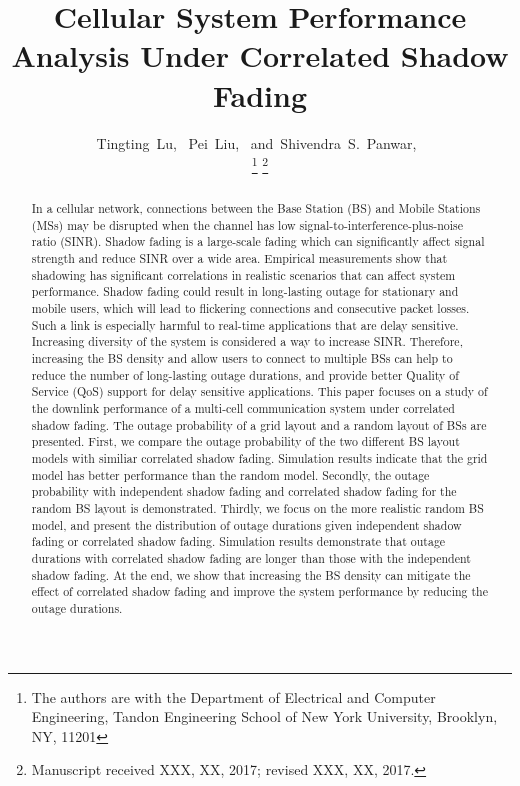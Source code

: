 \documentclass[journal,10pt]{IEEEtran}
\begin{document}

\title{Cellular System Performance Analysis Under Correlated Shadow Fading}


\author{Tingting~Lu,~
        Pei~Liu,~
        and~Shivendra~S.~Panwar,~%

\thanks{The authors are with the Department of Electrical and Computer Engineering, Tandon Engineering School of New York University, Brooklyn, NY, 11201}%
\thanks{Manuscript received XXX, XX, 2017; revised XXX, XX, 2017.}}

{}







\maketitle
\begin{abstract}
In a cellular network, connections between the Base Station (BS) and Mobile Stations (MSs) may be disrupted when the channel has low signal-to-interference-plus-noise ratio (SINR). Shadow fading is a large-scale fading which can significantly affect signal strength and reduce SINR over a wide area. Empirical measurements show that shadowing has significant correlations in realistic scenarios that can affect system performance.  Shadow fading could result in long-lasting outage for stationary and mobile users, which will lead to flickering connections and consecutive packet losses. Such a link is especially harmful to real-time applications that are delay sensitive. Increasing diversity of the system is considered a way to increase SINR. Therefore, increasing the BS density and allow users to connect to multiple BSs can help to reduce the number of long-lasting outage durations, and provide better Quality of Service (QoS) support for delay sensitive applications. This paper focuses on a study of the downlink performance of a multi-cell communication system under correlated shadow fading. The outage probability of a grid layout and a random layout of BSs are presented. First, we compare the outage probability of the two different BS layout models with similiar correlated shadow fading. Simulation results indicate that the grid model has better performance than the random model. Secondly, the outage probability with independent shadow fading and correlated shadow fading for the random BS layout is demonstrated. Thirdly, we focus on the more realistic random BS model, and present the distribution of outage durations given independent shadow fading or correlated shadow fading. Simulation results demonstrate that outage durations with correlated shadow fading are longer than those with the independent shadow fading. At the end, we show that increasing the BS density can mitigate the effect of correlated shadow fading and improve the system performance by reducing the outage durations. 

\end{abstract}
\end{document}

